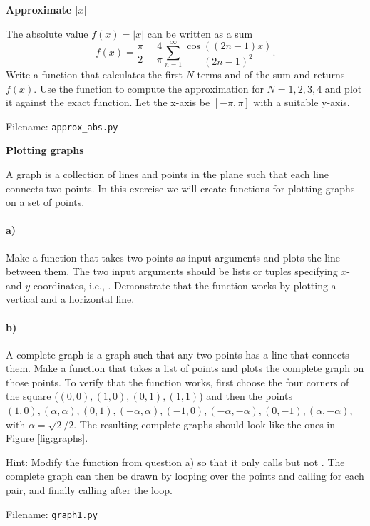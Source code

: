 \begin{Problem}{\textbf{Approximate $|x|$}}

\noindent The absolute value $f(x)=|x|$ can be written as a sum
\begin{equation*}
	f(x)=\frac{\pi}{2}-\frac{4}{\pi} \sum_{n=1}^\infty \frac{\cos((2n-1)x)}{(2n-1)^2}.
\end{equation*}
Write a function  that calculates the first $N$ terms and
of the sum and returns $f(x)$. Use the function to compute the approximation
for $N=1,2,3,4$ and plot it against the exact function. Let the x-axis
be $[-\pi,\pi]$ with a suitable y-axis.

Filename: \texttt{approx\_abs.py}
\end{Problem}

\begin{Problem}{\textbf{Plotting graphs}}

\noindent A graph is a collection of lines and points in the plane
such that each line connects two points. In this exercise we will create functions for
plotting graphs on a set of points.

\paragraph{a)}
Make a function  that takes two points as input arguments
and plots the line between them. The two input arguments should be lists or tuples specifying
$x$- and $y$-coordinates, i.e., . Demonstrate that the
function works by plotting a vertical and a horizontal line.

\paragraph{b)}
A complete graph is a graph such that any two points has a line that connects them. Make a
function  that takes a list of points and plots the
complete graph on those points. To verify that the
function works, first choose the four corners of the square ($(0,0),(1,0),(0,1),(1,1)$)
and then the points $(1,0), (\alpha,\alpha), (0,1), (-\alpha,\alpha),
(-1,0), (-\alpha,-\alpha),(0,-1), (\alpha,-\alpha)$, with $\alpha=\sqrt{2}/2$. The resulting
complete graphs should look like the ones in Figure \ref{fig:graphs}.

Hint: Modify the  function from question a) so that it only calls
 but not . The complete graph can then be drawn by
looping over the points and calling  for each pair, and finally calling
 after the loop.

Filename: \texttt{graph1.py}
\end{Problem}

